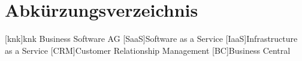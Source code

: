 \documentclass[12pt,bibtotoc]{article}
\newcounter{romanBeginningEnd} %
\begin{document}
    

	
	\setcounter{page}{1} %
	
	\tableofcontents %
	\newpage
	
	\setcounter{secnumdepth}{0} %
	\clearpage
	\listoffigures
	\clearpage
	\newpage
	\section{Abkürzungsverzeichnis}
	\begin{acronym}[LängsteAbkürzung] %
	[knk]{knk Business Software AG}
	[SaaS]{Software as a Service}
	[IaaS]{Infrastructure as a Service}
	[CRM]{Customer Relationship Management}
	[BC]{Business Central}
	\end{acronym}
	\newpage %
	
	\setcounter{secnumdepth}{3} %
	
	\setcounter{romanBeginningEnd}{\the\value{page}} %
	\setcounter{page}{1} %
	
	
	
	
\end{document}
